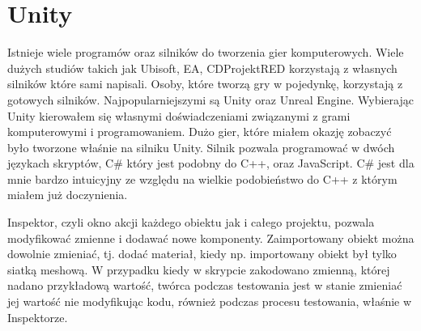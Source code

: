 \section{Unity}

\indent Istnieje wiele programów oraz silników do tworzenia gier komputerowych. Wiele dużych studiów takich jak Ubisoft, EA, CDProjektRED korzystają z własnych silników które sami napisali. Osoby, które tworzą gry w pojedynkę, korzystają z gotowych silników. Najpopularniejszymi są Unity oraz Unreal Engine. Wybierając Unity kierowałem się własnymi doświadczeniami związanymi z grami komputerowymi i programowaniem. Dużo gier, które miałem okazję zobaczyć było tworzone właśnie na silniku Unity. Silnik pozwala programować w dwóch językach skryptów, C\# który jest podobny do C++, oraz JavaScript. C\# jest dla mnie bardzo intuicyjny ze względu na wielkie podobieństwo do C++ z którym miałem już doczynienia. 

\indent Inspektor, czyli okno akcji każdego obiektu jak i całego projektu, pozwala modyfikować zmienne i dodawać nowe komponenty. Zaimportowany obiekt można dowolnie zmieniać, tj. dodać materiał, kiedy np. importowany obiekt był tylko siatką meshową. W przypadku kiedy w skrypcie zakodowano zmienną, której nadano przykładową wartość, twórca podczas testowania jest w stanie zmieniać jej wartość nie modyfikując kodu, również podczas procesu testowania, właśnie w Inspektorze. 

